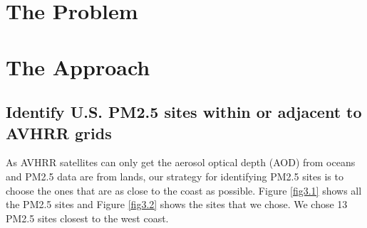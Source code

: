 \documentclass[12pt]{article}
\begin{document}
\section{The Problem}
%
%
%
%
%
%
%
%
%
%

\section{The Approach}

\subsection{Identify U.S. PM2.5 sites within or adjacent to AVHRR grids}
As AVHRR satellites can only get the aerosol optical depth (AOD) from oceans and PM2.5 data are from lands, our strategy for identifying PM2.5 sites is to choose the ones that are as close to the coast as possible. Figure \ref{fig3.1} shows all the PM2.5 sites and Figure \ref{fig3.2}  shows the sites that we chose. We chose 13 PM2.5 sites closest to the west coast.
\end{document}
